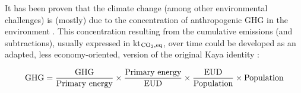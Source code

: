 It has been proven that the climate change (among other environmental challenges) is (mostly) due to the concentration of anthropogenic \gls{GHG} in the environment \cite{IPCC_CO2_budget}. This concentration resulting from the cumulative emissions (and subtractions), usually expressed in kt$_{\ce{CO2},\text{eq}}$, over time could be developed as an adapted, \ie less economy-oriented, version of the original Kaya identity \cite{kaya1997environment}:

\begin{equation}
\label{eq:equality_GHG}
\mathrm{GHG} =  \frac{\mathrm{GHG}}{\text{Primary energy}} \times \frac{\text{Primary energy}}{\mathrm{EUD}}\times \frac{\mathrm{EUD}}{\text{Population}} \times \text{Population}\\
 \end{equation}

